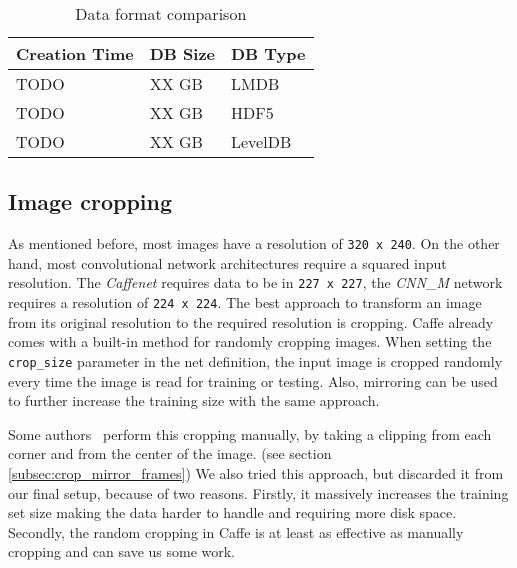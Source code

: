 \begin{table}[H]
\centering
\caption{Data format comparison}
\label{table:databases}
\begin{tabular}{lll}
\toprule
Creation Time 		& DB Size  & DB Type \\ \midrule
TODO           & XX GB  	 & LMDB \\
TODO          		& XX GB  	 & HDF5 \\
TODO          		& XX GB  	 & LevelDB \\
\bottomrule
\end{tabular}
\end{table}

\subsection{Image cropping}
As mentioned before, most images have a resolution of \texttt{320 x 240}.
On the other hand, most convolutional network architectures require a squared input resolution.
The \emph{Caffenet} requires data to be in \texttt{227 x 227}, the \emph{CNN\_M} network requires a resolution of \texttt{224 x 224}.
The best approach to transform an image from its original resolution to the required resolution is cropping.
Caffe already comes with a built-in method for randomly cropping images.
When setting the \texttt{crop\_size} parameter in the net definition, the input image is cropped randomly every time the image is read for training or testing.
Also, mirroring can be used to further increase the training size with the same approach.

Some authors~\cite{ye2015evaluating} perform this cropping manually, by taking a clipping from each corner and from the center of the image. (see section \ref{subsec:crop_mirror_frames})
We also tried this approach, but discarded it from our final setup, because of two reasons.
Firstly, it massively increases the training set size making the data harder to handle and requiring more disk space.
Secondly, the random cropping in Caffe is at least as effective  as manually cropping and can save us some work.

